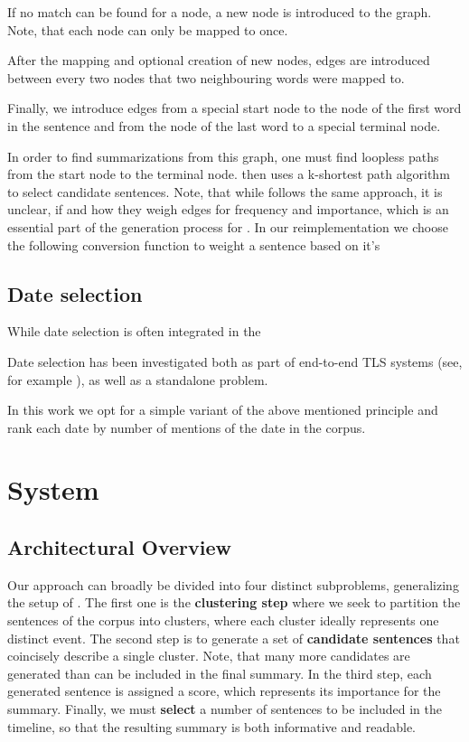 \documentclass[a4paper,BCOR=10mm]{report}
\begin{document}
If no match can be found for a node, a new node is introduced to the graph. Note, that each node can only be mapped to once.

After the mapping and optional creation of new nodes, edges are introduced between every two nodes that two neighbouring words were mapped to.

Finally, we introduce edges from a special start node to the node of the first word in the sentence and from the node of the last word to a special terminal node.

In order to find summarizations from this graph, one must find loopless paths from the start node to the terminal node. \citeauthor{fillipova} then uses a k-shortest path algorithm to select candidate sentences. Note, that while \citeauthor{banerjee} follows the same approach, it is unclear, if and how they weigh edges for frequency and importance, which is an essential part of the generation process for \citeauthor{fillipova}.
In our reimplementation we choose the following conversion function to weight a sentence based on it's


\section{Date selection}

While date selection is often integrated in the 

Date selection has been investigated both as part of end-to-end TLS systems (see, for example \citet{trans}), as well as a standalone problem.


In this work we opt for a simple variant of the above mentioned principle and rank each date by number of mentions of the date in the corpus.

\chapter{System}

\section{Architectural Overview}

Our approach can broadly be divided into four distinct subproblems, generalizing the setup of \citet{banerjee}.
The first one is the \textbf{clustering step} where we seek to partition the sentences of the corpus into clusters, where each cluster ideally represents one distinct event.
The second step is to generate a set of \textbf{candidate sentences} that coincisely describe a single cluster. Note, that many more candidates are generated than can be included in the final summary.
In the third step, each generated sentence is assigned a score, which represents its importance for the summary.
Finally, we must \textbf{select} a number of sentences to be included in the timeline, so that the resulting summary is both informative and readable.
\end{document}
